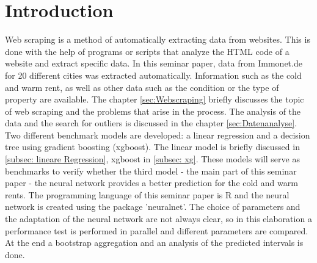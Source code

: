 \chapter{Introduction}\label{chap:Einleitung}
	Web scraping is a method of automatically extracting data from websites. This is done with the help of programs or scripts that analyze the HTML code of a website and extract specific data. In this seminar paper, data from Immonet.de for 20 different cities was extracted automatically. Information such as the cold and warm rent, as well as other data such as the condition or the type of property are available. The chapter \ref{sec:Webscraping} briefly discusses the topic of web scraping and the problems that arise in the process. The analysis of the data and the search for outliers is discussed in the chapter \ref{sec:Datenanalyse}.  Two different benchmark models are developed: a linear regression and a decision tree using gradient boosting (xgboost).  The linear model is briefly discussed in \ref{subsec: lineare Regression}, xgboost in \ref{subsec: xg}. These models will serve as benchmarks to verify whether the third model - the main part of this seminar paper - the neural network provides a better prediction for the cold and warm rents.  The programming language of this seminar paper is R and the neural network is created using the package 'neuralnet'. The choice of parameters and the adaptation of the neural network are not always clear, so in this elaboration a performance test is performed in parallel and different parameters are compared. At the end a bootstrap aggregation and an analysis of the predicted intervals is done.

